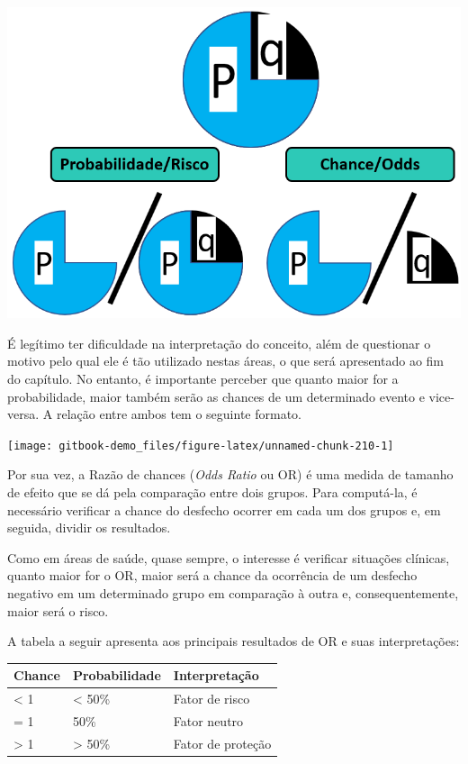 \documentclass[
]{book}
\begin{document}
\includegraphics{./img/cap_reg_log_odds.png}

É legítimo ter dificuldade na interpretação do conceito, além de
questionar o motivo pelo qual ele é tão utilizado nestas áreas, o que
será apresentado ao fim do capítulo. No entanto, é importante perceber
que quanto maior for a probabilidade, maior também serão as chances de
um determinado evento e vice-versa. A relação entre ambos tem o seguinte
formato.

\begin{center}\texttt{[image: gitbook-demo\_files/figure-latex/unnamed-chunk-210-1]} \end{center}

Por sua vez, a Razão de chances (\emph{Odds Ratio} ou OR) é uma medida
de tamanho de efeito que se dá pela comparação entre dois grupos. Para
computá-la, é necessário verificar a chance do desfecho ocorrer em cada
um dos grupos e, em seguida, dividir os resultados.

Como em áreas de saúde, quase sempre, o interesse é verificar situações
clínicas, quanto maior for o OR, maior será a chance da ocorrência de um
desfecho negativo em um determinado grupo em comparação à outra e,
consequentemente, maior será o risco.

A tabela a seguir apresenta aos principais resultados de OR e suas
interpretações:

\begin{longtable}[]{@{}lll@{}}
\toprule
Chance & Probabilidade & Interpretação\tabularnewline
\midrule
\endhead
\textless{} 1 & \textless{} 50\% & Fator de risco\tabularnewline
= 1 & 50\% & Fator neutro\tabularnewline
\textgreater{} 1 & \textgreater{} 50\% & Fator de
proteção\tabularnewline
\bottomrule
\end{longtable}
\end{document}
